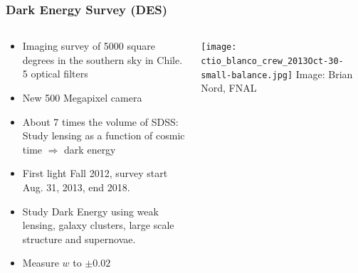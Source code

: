 \documentclass{beamer}
\begin{document}
\frame
{

    \frametitle{Dark Energy Survey (DES)}

    \fontsize{9}{0.8\baselineskip}

    \begin{columns}

        \begin{column}{0.5\textwidth}

            \begin{itemize}

                \item Imaging survey of 5000 square degrees in the southern
                    sky in Chile.  5 optical filters

                \item New 500 Megapixel camera

                \item About 7 times the volume of SDSS: Study lensing as a
                    function of {\color{gold}cosmic time $\Rightarrow$ dark
                    energy}

                \item First light Fall 2012, survey start Aug. 31, 2013, end 2018.

                \item Study Dark Energy using weak lensing, galaxy clusters,
                    large scale structure and supernovae.

                \item Measure {\color{gold} $w$} to {\color{gold} $\pm 0.02$}

            \end{itemize}

        \end{column}

        \begin{column}{0.5\textwidth}
            \texttt{[image: ctio\_blanco\_crew\_2013Oct-30-small-balance.jpg]}
            \newline
            \hfill {\tiny Image: Brian Nord, FNAL}
        \end{column}

    \end{columns}

}
\end{document}
